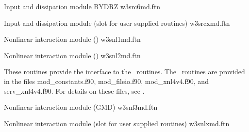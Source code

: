 
\noindent
Input and dissipation module BYDRZ \hfill {\file w3src6md.ftn}

\begin{flisti}
\end{flisti}

\noindent
Input and dissipation module (slot for user supplied routines) \hfill {\file
w3srcxmd.ftn}

\begin{flisti}
\end{flisti}

\noindent
Nonlinear interaction module (\dia) \hfill {\file w3snl1md.ftn}

\begin{flisti}
\end{flisti}

\noindent
Nonlinear interaction module (\xnl) \hfill {\file w3snl2md.ftn}

\begin{flisti}
\end{flisti}
These routines provide the interface to the \xnl\ routines. The \xnl\ routines
are provided in the files {\file mod\_constants.f90}, {\file mod\_fileio.f90},
{\file mod\_xnl4v4.f90}, and {\file serv\_xnl4v4.f90}. For details on these
files, see \cite{rep:vVl02b}.

\vspace{\baselineskip}
\noindent
Nonlinear interaction module (GMD) \hfill {\file w3snl3md.ftn}

\begin{flisti}
\end{flisti}

\vspace{\baselineskip}
\noindent
Nonlinear interaction module (slot for user supplied routines) \hfill {\file
w3snlxmd.ftn}


